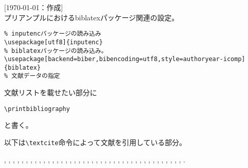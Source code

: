 \documentclass[10pt,a4j]{jarticle}
\begin{document}
[\today：作成]\\

プリアンプルにおけるbiblatexパッケージ関連の設定。
\begin{screen}
\begin{verbatim}
% inputencパッケージの読み込み
\usepackage[utf8]{inputenc}
% biblatexパッケージの読み込み。
\usepackage[backend=biber,bibencoding=utf8,style=authoryear-icomp]{biblatex}
% 文献データの指定

\end{verbatim}
\end{screen}
\vspace*{1em}

文献リストを載せたい部分に
\begin{screen}
\begin{verbatim}
\printbibliography
\end{verbatim}
\end{screen}
と書く。

\vspace*{2em}
以下は\verb|\textcite|命令によって文献を引用している部分。
\vspace*{1em}

\textcite{brezis93:_leapf_inter_compet},
\textcite{ishikawa94:_revis_stolp_samuel_rybcz_theor_produc_exter},
\textcite{Biker-2007-unemployment}, \textcite{Takeda2012a},
\textcite{takeda06:_cge_analy_welfar_effec_trade}, \textcite{yamazaki13:_japan},
\textcite{takeda10:_cge_analy_welfar_effec_trade},
\textcite{krugman91:_geogr_trade}, \textcite{fujita99jp:_spatial_econom},
\textcite{somusho04jp:2000io-kaisetsu}, \textcite{2009yamasue502165},
\textcite{2007yamasue482353}, \textcite{krugman91:_is_bilat_bad},
\textcite{lucas76:_econom_polic_evaluat},
\textcite{ishikawa03:_green_gas_emiss_contr_open_econom},
\textcite{rutherford00:_gtapin_gtap_eg}, \textcite{Takeda2011b},
\textcite{takeda2011c}, \textcite{Babiker-1999-KyotoProtocoland},
\textcite{wong95:_inter_trade_goods_factor_mobil_},
\textcite{milne-thomson68:_theor_hydrod},
\textcite{wang89:_model_therm_hydrod_aspec_molten}, \textcite{brooke03:_gams},
\textcite{iwamoto91jp:haito-keika}, \textcite{Hattori00}, \textcite{Hattori01},
\textcite{Hattori02}, \textcite{imai71:_micr_1}, \textcite{imai72:_micr_2},
\textcite{ito85:_inte_trad}, \textcite{kuroda97jp:keo},
\textcite{miyazawa02:_io_intr}, \textcite{katayama2001},
\textcite{markusen99jp:trade_vol_1}, \textcite{barro97jp},
\textcite{nishimura90:_micr_econ}, \textcite{arimura-takeda2012},
\textcite{oyama99:_mark_stru}, \textcite{isikawa02jp:_env_trade},
\textcite{takeda2012_cge}, \textcite{kiyono93:_regu_comp_1},
\textcite{takeda2013jecon}.

\nocite{*}

\printbibliography
\end{document}
